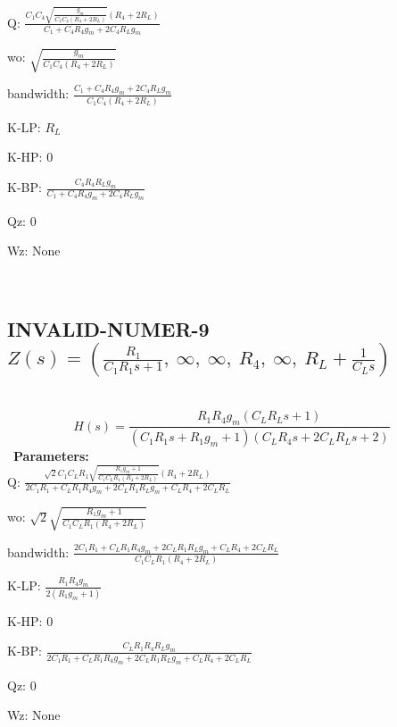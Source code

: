 \documentclass{article}
\begin{document}
Q: $\frac{C_{1} C_{4} \sqrt{\frac{g_{m}}{C_{1} C_{4} \left(R_{4} + 2 R_{L}\right)}} \left(R_{4} + 2 R_{L}\right)}{C_{1} + C_{4} R_{4} g_{m} + 2 C_{4} R_{L} g_{m}}$\ 

wo: $\sqrt{\frac{g_{m}}{C_{1} C_{4} \left(R_{4} + 2 R_{L}\right)}}$\ 

bandwidth: $\frac{C_{1} + C_{4} R_{4} g_{m} + 2 C_{4} R_{L} g_{m}}{C_{1} C_{4} \left(R_{4} + 2 R_{L}\right)}$\ 

K-LP: $R_{L}$\ 

K-HP: $0$\ 

K-BP: $\frac{C_{4} R_{4} R_{L} g_{m}}{C_{1} + C_{4} R_{4} g_{m} + 2 C_{4} R_{L} g_{m}}$\ 

Qz: $0$\ 

Wz: $\text{None}$\ 

\ 

\subsection{INVALID-NUMER-9 $Z(s) = \left( \frac{R_{1}}{C_{1} R_{1} s + 1}, \  \infty, \  \infty, \  R_{4}, \  \infty, \  R_{L} + \frac{1}{C_{L} s}\right)$ } \ 
\textbf{\[H(s) = \frac{R_{1} R_{4} g_{m} \left(C_{L} R_{L} s + 1\right)}{\left(C_{1} R_{1} s + R_{1} g_{m} + 1\right) \left(C_{L} R_{4} s + 2 C_{L} R_{L} s + 2\right)}\] } \ 
\textbf{Parameters:}\\ 

Q: $\frac{\sqrt{2} C_{1} C_{L} R_{1} \sqrt{\frac{R_{1} g_{m} + 1}{C_{1} C_{L} R_{1} \left(R_{4} + 2 R_{L}\right)}} \left(R_{4} + 2 R_{L}\right)}{2 C_{1} R_{1} + C_{L} R_{1} R_{4} g_{m} + 2 C_{L} R_{1} R_{L} g_{m} + C_{L} R_{4} + 2 C_{L} R_{L}}$\ 

wo: $\sqrt{2} \sqrt{\frac{R_{1} g_{m} + 1}{C_{1} C_{L} R_{1} \left(R_{4} + 2 R_{L}\right)}}$\ 

bandwidth: $\frac{2 C_{1} R_{1} + C_{L} R_{1} R_{4} g_{m} + 2 C_{L} R_{1} R_{L} g_{m} + C_{L} R_{4} + 2 C_{L} R_{L}}{C_{1} C_{L} R_{1} \left(R_{4} + 2 R_{L}\right)}$\ 

K-LP: $\frac{R_{1} R_{4} g_{m}}{2 \left(R_{1} g_{m} + 1\right)}$\ 

K-HP: $0$\ 

K-BP: $\frac{C_{L} R_{1} R_{4} R_{L} g_{m}}{2 C_{1} R_{1} + C_{L} R_{1} R_{4} g_{m} + 2 C_{L} R_{1} R_{L} g_{m} + C_{L} R_{4} + 2 C_{L} R_{L}}$\ 

Qz: $0$\ 

Wz: $\text{None}$\ 

\ 
\end{document}
